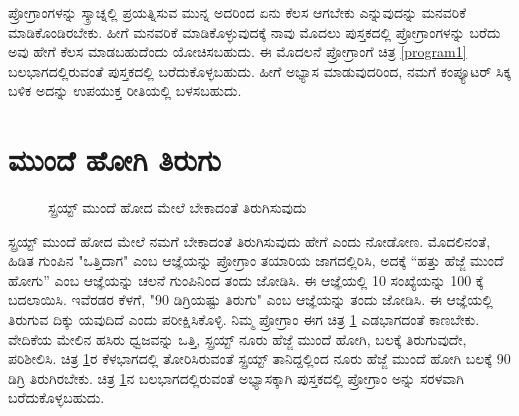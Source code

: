 ಪ್ರೋಗ್ರಾಂಗಳನ್ನು ಸ್ಕ್ರಾಚ್ನಲ್ಲಿ ಪ್ರಯತ್ನಿಸುವ ಮುನ್ನ ಅದರಿಂದ ಏನು ಕೆಲಸ ಆಗಬೇಕು ಎನ್ನುವುದನ್ನು ಮನವರಿಕೆ ಮಾಡಿಕೊಂಡಿರಬೇಕು. ಹೀಗೆ ಮನವರಿಕೆ ಮಾಡಿಕೊಳ್ಳುವುದಕ್ಕೆ ನಾವು ಮೊದಲು ಪುಸ್ತಕದಲ್ಲಿ ಪ್ರೋಗ್ರಾಂಗಳನ್ನು ಬರೆದು ಅವು ಹೇಗೆ ಕೆಲಸ ಮಾಡಬಹುದೆಂದು ಯೋಚಿಸಬಹುದು.  ಈ ಮೊದಲನೆ ಪ್ರೋಗ್ರಾಂಗೆ ಚಿತ್ರ \ref{program1} ಬಲಭಾಗದಲ್ಲಿರುವಂತೆ ಪುಸ್ತಕದಲ್ಲಿ  ಬರೆದುಕೊಳ್ಳಬಹುದು.  ಹೀಗೆ ಅಭ್ಯಾಸ ಮಾಡುವುದರಿಂದ, ನಮಗೆ ಕಂಪ್ಯೂಟರ್ ಸಿಕ್ಕ ಬಳಿಕ ಅದನ್ನು ಉಪಯುಕ್ತ ರೀತಿಯಲ್ಲಿ ಬಳಸಬಹುದು. 

\section{ಮುಂದೆ ಹೋಗಿ ತಿರುಗು}

\begin{figure}[h]
\begin{center}
\begin{multicols}{2}
\begin{Scratch}[1]
\beginbox{}
\end{Scratch}


\end{multicols}

\end{center}
\caption{ಸ್ಪ್ರಯ್ಟ್ ಮುಂದೆ ಹೋದ ಮೇಲೆ ಬೇಕಾದಂತೆ ತಿರುಗಿಸುವುದು}
\label{program2}
\end{figure}

ಸ್ಪ್ರಯ್ಟ್ ಮುಂದೆ ಹೋದ ಮೇಲೆ ನಮಗೆ ಬೇಕಾದಂತೆ ತಿರುಗಿಸುವುದು ಹೇಗೆ ಎಂದು ನೋಡೋಣ. ಮೊದಲಿನಂತೆ, ಹಿಡಿತ ಗುಂಪಿನ "ಒತ್ತಿದಾಗ" ಎಂಬ ಆಜ್ಞೆಯನ್ನು ಪ್ರೋಗ್ರಾಂ ತಯಾರಿಯ ಜಾಗದಲ್ಲಿರಿಸಿ, ಅದಕ್ಕೆ “ಹತ್ತು ಹೆಜ್ಜೆ ಮುಂದೆ ಹೋಗು” ಎಂಬ ಆಜ್ಞೆಯನ್ನು ಚಲನೆ ಗುಂಪಿನಿಂದ ತಂದು ಜೋಡಿಸಿ.  ಈ ಆಜ್ಞೆಯಲ್ಲಿ 10 ಸಂಖ್ಯೆಯನ್ನು 100 ಕ್ಕೆ ಬದಲಾಯಿಸಿ.  ಇವೆರಡರ ಕೆಳಗೆ,  "90 ಡಿಗ್ರಿಯಷ್ಟು ತಿರುಗು" ಎಂಬ ಆಜ್ಞೆಯನ್ನು ತಂದು ಜೋಡಿಸಿ.  ಈ ಆಜ್ಞೆಯಲ್ಲಿ ತಿರುಗುವ ದಿಕ್ಕು ಯವುದಿದೆ ಎಂದು ಪರೀಕ್ಷಿಸಿಕೊಳ್ಳಿ. ನಿಮ್ಮ ಪ್ರೋಗ್ರಾಂ ಈಗ ಚಿತ್ರ \ref{program2}  ಎಡಭಾಗದಂತೆ ಕಾಣಬೇಕು.    ವೇದಿಕೆಯ ಮೇಲಿನ ಹಸಿರು ಧ್ವಜವನ್ನು ಒತ್ತಿ,  ಸ್ಪ್ರಯ್ಟ್ ನೂರು ಹೆಜ್ಜೆ ಮುಂದೆ ಹೋಗಿ, ಬಲಕ್ಕೆ ತಿರುಗುವುದೇ, ಪರಿಶೀಲಿಸಿ.  ಚಿತ್ರ \ref{program2}ರ ಕೆಳಭಾಗದಲ್ಲಿ ತೋರಿಸಿರುವಂತೆ ಸ್ಪ್ರಯ್ಟ್ ತಾನಿದ್ದಲ್ಲಿಂದ ನೂರು ಹೆಜ್ಜೆ ಮುಂದೆ ಹೋಗಿ ಬಲಕ್ಕೆ 90 ಡಿಗ್ರಿ ತಿರುಗಿರಬೇಕು.  ಚಿತ್ರ \ref{program2}ನ ಬಲಭಾಗದಲ್ಲಿರುವಂತೆ  ಅಭ್ಯಾಸಕ್ಕಾಗಿ ಪುಸ್ತಕದಲ್ಲಿ  ಪ್ರೋಗ್ರಾಂ ಅನ್ನು ಸರಳವಾಗಿ ಬರೆದುಕೊಳ್ಳಬಹುದು. 

